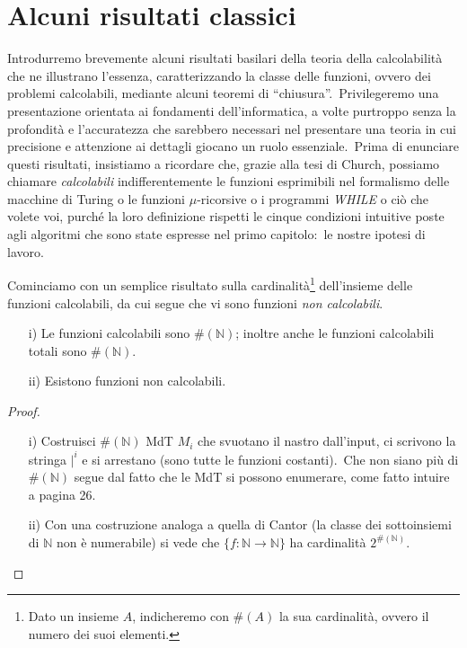 \section{Alcuni risultati classici}

Introdurremo brevemente alcuni risultati basilari della teoria della calcolabilità che ne illustrano l'essenza, caratterizzando la classe delle funzioni, ovvero dei problemi calcolabili, mediante alcuni teoremi di ``chiusura''.\
Privilegeremo una presentazione orientata ai fondamenti dell'informatica, a volte purtroppo senza la profondità e l'accuratezza che sarebbero necessari nel presentare una teoria in cui precisione e attenzione ai dettagli giocano un ruolo essenziale.\
Prima di enunciare questi risultati, insistiamo a ricordare che, grazie alla tesi di Church, possiamo chiamare \textit{calcolabili} indifferentemente le funzioni esprimibili nel formalismo delle macchine di Turing o le funzioni $\mu$-ricorsive o i programmi \textit{\footnotesize WHILE} o ciò che volete voi, purché la loro definizione rispetti le cinque condizioni intuitive poste agli algoritmi che sono state espresse nel primo capitolo:\ le nostre ipotesi di lavoro.

Cominciamo con un semplice risultato sulla cardinalità\footnote{Dato un insieme $A$, indicheremo con $\#(A)$ la sua cardinalità, ovvero il numero dei suoi elementi.} dell'insieme delle funzioni calcolabili, da cui segue che vi sono funzioni \textit{non calcolabili}.

\begin{theorem}
    \label{n_fcalcolabili}
    \hfill
    \begin{itemize}
        \item[i)] Le funzioni calcolabili sono $\#(\mathbb{N})$; inoltre anche le funzioni calcolabili totali sono $\#(\mathbb{N})$.
        \item[ii)] Esistono funzioni non calcolabili.
    \end{itemize}
\end{theorem}

\begin{proof}
    \hfill
    \begin{itemize}
        \item[i)] Costruisci $\#(\mathbb{N})$ MdT $M_i$ che svuotano il nastro dall'input, ci scrivono la stringa $|^i$ e si arrestano (sono tutte le funzioni costanti).\ Che non siano più di $\#(\mathbb{N})$ segue dal fatto che le MdT si possono enumerare, come fatto intuire a pagina 26.\
        \item[ii)] Con una costruzione analoga a quella di Cantor (la classe dei sottoinsiemi di $\mathbb{N}$ non è numerabile) si vede che $\{f : \mathbb{N} \rightarrow \mathbb{N}\}$ ha cardinalità $2^{\#(\mathbb{N})}$.
    \end{itemize}
\end{proof}

